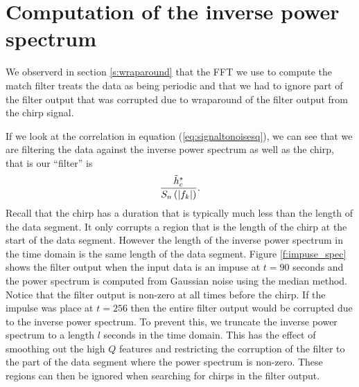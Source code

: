 \section{Computation of the inverse power spectrum}
\label{ss:invspec}

We observerd in section \ref{s:wraparound} that the FFT we use to compute the
match filter treats the data as being periodic and that we had to ignore part
of the filter output that was corrupted due to wraparound of the filter output
from the chirp signal. 

If we look at the correlation in equation (\ref{eq:signaltonoisesq}), we can
see that we are filtering the data against the inverse power
spectrum as well as the chirp, that is our ``filter'' is
\begin{equation}
\frac{\tilde{h}_c^\ast}{S_n\left(\left|f_{k}\right|\right)}.
\end{equation}
Recall that the chirp has a duration that is typically much less than the
length of the data segment. It only corrupts a region that is the length of
the chirp at the start of the data segment. However the length of the 
inverse power spectrum in the time domain is the same length of the data
segment. Figure \ref{f:impuse_spec} shows the filter output when the input
data is an impuse at $t=90$ seconds and the power spectrum is computed from
Gaussian noise using the median method. Notice that the filter output is
non-zero at all times before the chirp. If the impulse was place at $t=256$
then the entire filter output would be corrupted due to the inverse power
spectrum.  To prevent this, we truncate the inverse power spectrum to a
length $l$ seconds in the time domain. This has the effect of smoothing out the
high $Q$ features and restricting the corruption of the filter to the part of
the data segment where the power spectrum is non-zero. These regions can then
be ignored when searching for chirps in the filter output.

